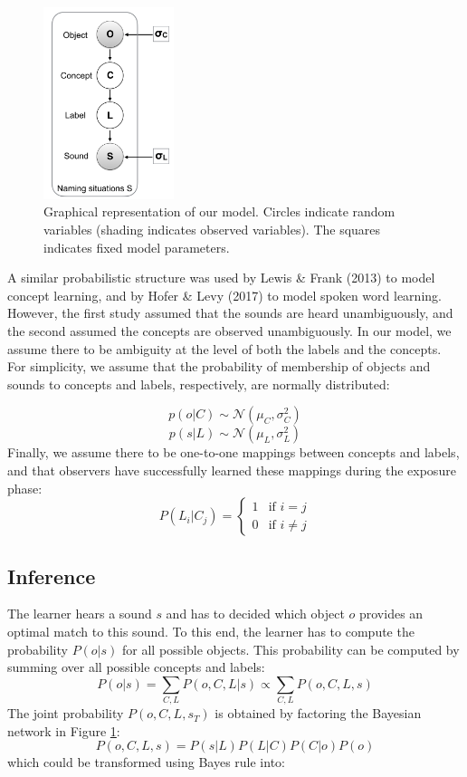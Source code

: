 \documentclass[10pt, letterpaper]{article}
\begin{document}
\begin{figure}
\centering
\includegraphics[width=1.5in]{figs/model.png}
\caption{Graphical representation of our model. Circles indicate random variables (shading indicates observed variables). The squares indicates fixed model parameters.}
\label{fig:model}
\end{figure}

A similar probabilistic structure was used by Lewis \& Frank (2013) to
model concept learning, and by Hofer \& Levy (2017) to model spoken word
learning. However, the first study assumed that the sounds are heard
unambiguously, and the second assumed the concepts are observed
unambiguously. In our model, we assume there to be ambiguity at the
level of both the labels and the concepts. For simplicity, we assume
that the probability of membership of objects and sounds to concepts and
labels, respectively, are normally distributed:

\[ p(o | C) \sim  \mathcal{N}(\mu_C, \sigma^2_C) \]
\[ p(s| L) \sim  \mathcal{N}(\mu_L, \sigma^2_L) \] Finally, we assume
there to be one-to-one mappings between concepts and labels, and that
observers have successfully learned these mappings during the exposure
phase: \[
P(L_i|C_j) = 
\begin{cases}
  1 & \text{if  }  i=j \\  
  0  & \text{if  }  i\neq j 
\end{cases}
\]

\subsection{Inference}\label{inference}

The learner hears a sound \(s\) and has to decided which object \(o\)
provides an optimal match to this sound. To this end, the learner has to
compute the probability \(P(o|s)\) for all possible objects. This
probability can be computed by summing over all possible concepts and
labels:
\[P(o|s)=\sum_{C,L} P(o, C, L| s) \propto \sum_{C,L} P(o, C, L, s) \]
The joint probability \(P(o, C, L, s_T)\) is obtained by factoring the
Bayesian network in Figure \ref{fig:model}:
\[P(o,C,L,s) = P(s|L)P(L|C)P(C|o)P(o) \] which could be transformed
using Bayes rule into:
\end{document}
